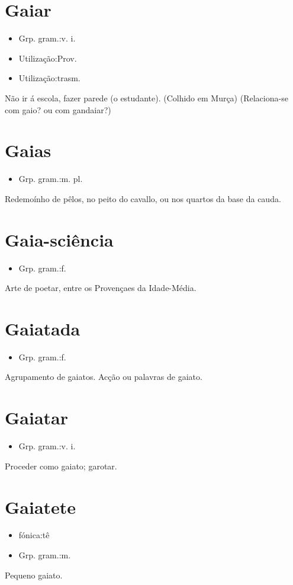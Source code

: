 \section{Gaiar}
\begin{itemize}
\item {Grp. gram.:v. i.}
\end{itemize}
\begin{itemize}
\item {Utilização:Prov.}
\end{itemize}
\begin{itemize}
\item {Utilização:trasm.}
\end{itemize}
Não ir á escola, fazer parede (o estudante). (Colhido em Murça)
(Relaciona-se com \textunderscore gaio\textunderscore ? ou com \textunderscore gandaiar\textunderscore ?)
\section{Gaias}
\begin{itemize}
\item {Grp. gram.:m. pl.}
\end{itemize}
Redemoínho de pêlos, no peito do cavallo, ou nos quartos da base da cauda.
\section{Gaia-sciência}
\begin{itemize}
\item {Grp. gram.:f.}
\end{itemize}
Arte de poetar, entre os Provençaes da Idade-Média.
\section{Gaiatada}
\begin{itemize}
\item {Grp. gram.:f.}
\end{itemize}
Agrupamento de gaiatos.
Acção ou palavras de gaiato.
\section{Gaiatar}
\begin{itemize}
\item {Grp. gram.:v. i.}
\end{itemize}
Proceder como gaiato; garotar.
\section{Gaiatete}
\begin{itemize}
\item {fónica:tê}
\end{itemize}
\begin{itemize}
\item {Grp. gram.:m.}
\end{itemize}
Pequeno gaiato.
